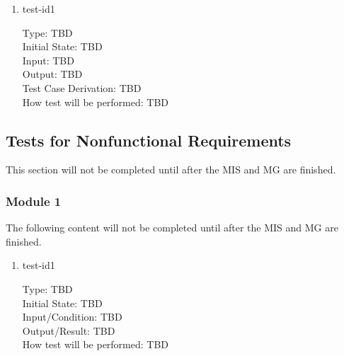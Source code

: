 \documentclass[12pt, titlepage]{article}
\begin{document}
\begin{enumerate}

\item{test-id1\\}

Type: TBD \\
Initial State: TBD	\\			
Input: TBD	\\			
Output: TBD \\
Test Case Derivation: TBD \\
How test will be performed: TBD \\
    
\end{enumerate}

\subsection{Tests for Nonfunctional Requirements}
This section will not be completed until after the MIS and MG are finished.

\subsubsection{Module 1}
The following content will not be completed until after the MIS and MG are finished.		
\begin{enumerate}

\item{test-id1\\}

Type: TBD \\				
Initial State: TBD	\\			
Input/Condition: TBD \\				
Output/Result: TBD	\\			
How test will be performed: TBD \\

\end{enumerate}
				
\end{document}
